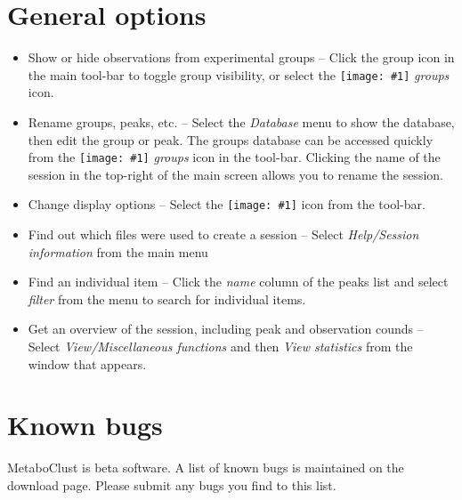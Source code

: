 \documentclass[11pt,a4paper]{article}
\newcommand{\menu}[1]{ \flqq\textit{#1}\frqq}
\newcommand{\icon}[1]{\texttt{[image: \#1]}}
\begin{document}
\section{General options}

\begin{itemize}
	\item Show or hide observations from experimental groups -- Click the group icon in the main tool-bar to toggle group visibility, or select the \icon{groups} \menu{groups} icon.
	\item Rename groups, peaks, etc. -- Select the \menu{Database} menu to show the database, then edit the group or peak. The groups database can be accessed quickly from the \icon{groups} \menu{groups} icon in the tool-bar. Clicking the name of the session in the top-right of the main screen allows you to rename the session.
	\item Change display options -- Select the \icon{prefs} icon from the tool-bar.
	\item Find out which files were used to create a session -- Select \menu{Help/Session information} from the main menu
	\item Find an individual item -- Click the \menu{name} column of the peaks list and select \menu{filter} from the menu to search for individual items.
	\item Get an overview of the session, including peak and observation counds -- Select \menu{View/Miscellaneous functions} and then \menu{View statistics} from the window that appears.
\end{itemize}

\section{Known bugs}
MetaboClust is beta software. A list of known bugs is maintained on the download page. Please submit any bugs you find to this list.
\end{document}
